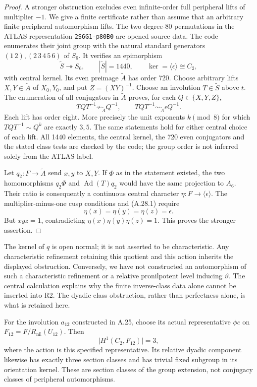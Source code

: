 \begin{proof}
A stronger obstruction excludes even infinite-order
full peripheral lifts of multiplier \(-1\).
We give a finite certificate rather than assume
that an arbitrary finite peripheral automorphism
lifts. The two degree-80 permutations in the
ATLAS representation \texttt{2S6G1-p80B0}
are opened source data. The code
 enumerates their
joint group with the natural standard generators
\((1\,2),(2\,3\,4\,5\,6)\) of \(S_6\).
It verifies an epimorphism
\[
 \widetilde S\twoheadrightarrow S_6,
 \qquad |\widetilde S|=1440,
 \qquad \ker=\langle\epsilon\rangle\cong C_2,
\]
with central kernel. Its even preimage
\(\widetilde A\) has order 720. Choose arbitrary
lifts \(X,Y\in\widetilde A\) of \(X_0,Y_0\),
and put \(Z=(XY)^{-1}\). Choose an involution
\(T\in\widetilde S\) above \(t\).
The enumeration of all conjugators in
\(\widetilde A\) proves, for each
\(Q\in\{X,Y,Z\}\),
\[
 TQT^{-1}\not\sim_{\widetilde A}Q^{-1},
 \qquad
 TQT^{-1}\sim_{\widetilde A}\epsilon Q^{-1}.
 \tag{A.28.1}
\]
Each lift has order eight. More precisely the
unit exponents \(k\pmod8\) for which
\(TQT^{-1}\sim Q^k\) are exactly \(3,5\).
The same statements hold for either central
choice of each lift. All 1440 elements, the
central kernel, the 720 even conjugators and
the stated class tests are checked by the code;
the group order is not inferred solely from
the ATLAS label.\cite{AAtlasA6}

Let \(q_2:F\to\widetilde A\) send \(x,y\)
to \(X,Y\). If \(\Phi\) as in the statement
existed, the two homomorphisms
\(q_2\Phi\) and \(\operatorname{Ad}(T)q_2\)
would have the same projection to \(A_6\).
Their ratio is consequently a continuous central
character \(\eta:F\to\langle\epsilon\rangle\).
The multiplier-minus-one cusp conditions and
(A.28.1) require
\[
             \eta(x)=\eta(y)=\eta(z)=\epsilon.
\]
But \(xyz=1\), contradicting
\(\eta(x)\eta(y)\eta(z)=1\).
This proves the stronger assertion.
\end{proof}

The kernel of \(q\) is open normal; it is not
asserted to be characteristic. Any characteristic
refinement retaining this quotient and this action
inherits the displayed obstruction. Conversely,
we have not constructed an automorphism of such a
characteristic refinement or a relative pronilpotent
level inducing \(\vartheta\). The central calculation
explains why the finite inverse-class data alone
cannot be inserted into R2. The dyadic class
obstruction, rather than perfectness alone, is
what is retained here.

For the involution \(a_{12}\) constructed in A.25,
choose its actual representative \(\phi c\) on
\(F_{12}=F/R_{\mathrm{nil}}(U_{12})\).
Then
\[
                \bigl|H^1(C_2,F_{12})\bigr|=3,
\]
where the action is this specified representative.
Its relative dyadic component likewise has exactly
three section classes and has trivial fixed subgroup
in its orientation kernel. These are section
classes of the group extension, not conjugacy
classes of peripheral automorphisms.

